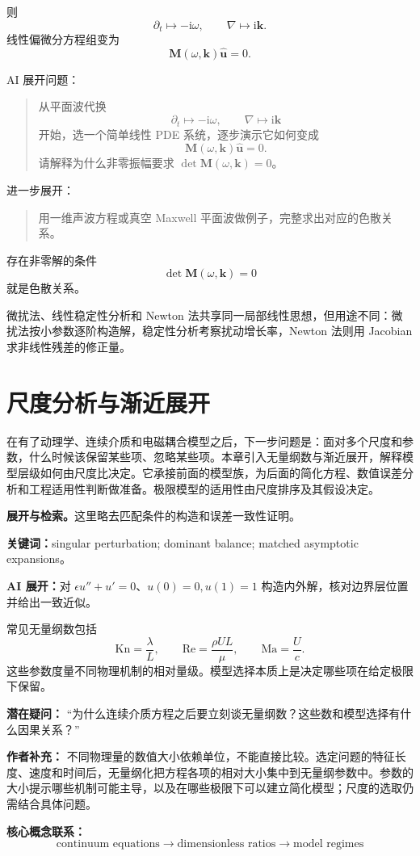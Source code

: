 \documentclass[11pt,openany]{ctexbook}
\newcommand{\ii}{\mathrm i}
\newcommand{\studyroute}[3]{%
  \par\smallskip\noindent\textbf{展开与检索。}#1\par
  \noindent\textbf{关键词：}#2。\par
  \noindent\textbf{AI 展开：}#3\par
}
\begin{document}
则
\[
\partial_t\mapsto-\ii\omega,
\qquad
\nabla\mapsto\ii\bm k.
\]
线性偏微分方程组变为
\[
\bm M(\omega,\bm k)\widehat{\bm u}=0.
\]

\begin{askai}
AI 展开问题：
\begin{quote}
从平面波代换
\[
\partial_t\mapsto-\ii\omega,\qquad \nabla\mapsto\ii\bm k
\]
开始，选一个简单线性 PDE 系统，逐步演示它如何变成
\[
\bm M(\omega,\bm k)\widehat{\bm u}=0.
\]
请解释为什么非零振幅要求 \(\det\bm M(\omega,\bm k)=0\)。
\end{quote}

进一步展开：
\begin{quote}
用一维声波方程或真空 Maxwell 平面波做例子，完整求出对应的色散关系。
\end{quote}
\end{askai}

存在非零解的条件
\[
\det\bm M(\omega,\bm k)=0
\]
就是色散关系。

微扰法、线性稳定性分析和 Newton 法共享同一局部线性思想，但用途不同：微扰法按小参数逐阶构造解，稳定性分析考察扰动增长率，Newton 法则用 Jacobian 求非线性残差的修正量。

\chapter{尺度分析与渐近展开}

\begin{chaptersummary}
在有了动理学、连续介质和电磁耦合模型之后，下一步问题是：面对多个尺度和参数，什么时候该保留某些项、忽略某些项。本章引入无量纲数与渐近展开，解释模型层级如何由尺度比决定。它承接前面的模型族，为后面的简化方程、数值误差分析和工程适用性判断做准备。极限模型的适用性由尺度排序及其假设决定。
\end{chaptersummary}
\studyroute{这里略去匹配条件的构造和误差一致性证明。}{singular perturbation; dominant balance; matched asymptotic expansions}{对 $\epsilon u''+u'=0$、$u(0)=0,u(1)=1$ 构造内外解，核对边界层位置并给出一致近似。}

常见无量纲数包括
\[
\mathrm{Kn}=\frac{\lambda}{L},
\qquad
\mathrm{Re}=\frac{\rho UL}{\mu},
\qquad
\mathrm{Ma}=\frac{U}{c}.
\]
这些参数度量不同物理机制的相对量级。模型选择本质上是决定哪些项在给定极限下保留。

\begin{authornote}
\textbf{潜在疑问：}
“为什么连续介质方程之后要立刻谈无量纲数？这些数和模型选择有什么因果关系？”

\textbf{作者补充：}
不同物理量的数值大小依赖单位，不能直接比较。选定问题的特征长度、速度和时间后，无量纲化把方程各项的相对大小集中到无量纲参数中。参数的大小提示哪些机制可能主导，以及在哪些极限下可以建立简化模型；尺度的选取仍需结合具体问题。

\textbf{核心概念联系：}
\[
\text{continuum equations}
\longrightarrow
\text{dimensionless ratios}
\longrightarrow
\text{model regimes}
\]
\end{authornote}
\end{document}
